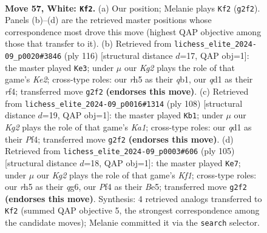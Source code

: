 \documentclass[11pt]{article}
\begin{document}
\clearpage

\begin{figure}[p]\centering
\begin{subfigure}{0.46\textwidth}\centering
\resizebox{\linewidth}{!}{%
\newchessgame
\chessboard[
  setfen={8/6pk/1P6/7r/3ppP2/8/6K1/3q4 w - - 3 57},
  showmover=false,
  pgfstyle=straightmove, color=movearrow, markmove={g2-f2}
]}
\caption{}
\end{subfigure}\hfill
\begin{subfigure}{0.46\textwidth}\centering
\resizebox{\linewidth}{!}{%
\newchessgame
\chessboard[
  setfen={8/8/8/5p2/5r1p/7P/2k1K3/1q6 w - - 0 59},
  showmover=false,
  pgfstyle=straightmove, color=movearrow, markmove={e2-e3}
]}
\caption{}
\end{subfigure}
\\[4pt]
\begin{subfigure}{0.46\textwidth}\centering
\resizebox{\linewidth}{!}{%
\newchessgame
\chessboard[
  setfen={8/8/8/5p1p/2p2P1P/2k5/2r5/K7 w - - 0 55},
  showmover=false,
  pgfstyle=straightmove, color=movearrow, markmove={a1-b1}
]}
\caption{}
\end{subfigure}\hfill
\begin{subfigure}{0.46\textwidth}\centering
\resizebox{\linewidth}{!}{%
\newchessgame
\chessboard[
  setfen={5k2/8/1P4Q1/4b3/p7/2p5/5P2/6K1 b - - 0 53},
  showmover=false,
  pgfstyle=straightmove, color=movearrow, markmove={f8-e7}
]}
\caption{}
\end{subfigure}
\caption{\textbf{Move 57, White: \texttt{Kf2}.} (a) Our position; Melanie plays \texttt{Kf2} (\texttt{g2f2}). Panels (b)--(d) are the retrieved master positions whose correspondence most drove this move (highest QAP objective among those that transfer to it). (b) Retrieved from \texttt{lichess\_elite\_2024-09\_p0020\#3846} (ply 116) [structural distance $d$=17, QAP obj=1]: the master played \texttt{Ke3}; under $\mu$ our \emph{Kg2} plays the role of that game's \emph{Ke2}; cross-type roles: our \emph{r}h5 as their \emph{q}b1, our \emph{q}d1 as their \emph{r}f4; transferred move \texttt{g2f2} \textbf{(endorses this move)}. (c) Retrieved from \texttt{lichess\_elite\_2024-09\_p0016\#1314} (ply 108) [structural distance $d$=19, QAP obj=1]: the master played \texttt{Kb1}; under $\mu$ our \emph{Kg2} plays the role of that game's \emph{Ka1}; cross-type roles: our \emph{q}d1 as their \emph{P}f4; transferred move \texttt{g2f2} \textbf{(endorses this move)}. (d) Retrieved from \texttt{lichess\_elite\_2024-09\_p0003\#606} (ply 105) [structural distance $d$=18, QAP obj=1]: the master played \texttt{Ke7}; under $\mu$ our \emph{Kg2} plays the role of that game's \emph{Kf1}; cross-type roles: our \emph{r}h5 as their \emph{q}g6, our \emph{P}f4 as their \emph{B}e5; transferred move \texttt{g2f2} \textbf{(endorses this move)}. Synthesis: 4 retrieved analogs transferred to \texttt{Kf2} (summed QAP objective 5, the strongest correspondence among the candidate moves); Melanie committed it via the \texttt{search} selector.}
\label{fig:thought-m112}
\end{figure}
\end{document}
